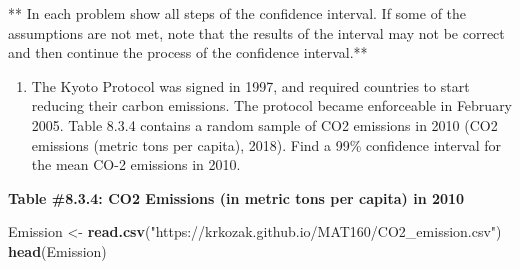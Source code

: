 \documentclass[]{book}
\newenvironment{Shaded}{\begin{snugshade}}{\end{snugshade}}
\newcommand{\KeywordTok}[1]{\textcolor[rgb]{0.13,0.29,0.53}{\textbf{#1}}}
\newcommand{\NormalTok}[1]{#1}
\newcommand{\StringTok}[1]{\textcolor[rgb]{0.31,0.60,0.02}{#1}}
\providecommand{\tightlist}{%
  \setlength{\itemsep}{0pt}\setlength{\parskip}{0pt}}
\begin{document}
** In each problem show all steps of the confidence interval. If some of the assumptions are not met, note that the results of the interval may not be correct and then continue the process of the confidence interval.**

\begin{enumerate}
\def\labelenumi{\arabic{enumi}.}
\tightlist
\item
  The Kyoto Protocol was signed in 1997, and required countries to start reducing their carbon emissions. The protocol became enforceable in February 2005. Table 8.3.4 contains a random sample of CO2 emissions in 2010 (CO2 emissions (metric tons per capita), 2018). Find a 99\% confidence interval for the mean CO-2 emissions in 2010.
\end{enumerate}

\textbf{Table \#8.3.4: CO2 Emissions (in metric tons per capita) in 2010}

\begin{Shaded}
\begin{Highlighting}[]
\NormalTok{Emission <-}\StringTok{ }\KeywordTok{read.csv}\NormalTok{(}\StringTok{"https://krkozak.github.io/MAT160/CO2_emission.csv"}\NormalTok{)}
\KeywordTok{head}\NormalTok{(Emission)}
\end{Highlighting}
\end{Shaded}
\end{document}
